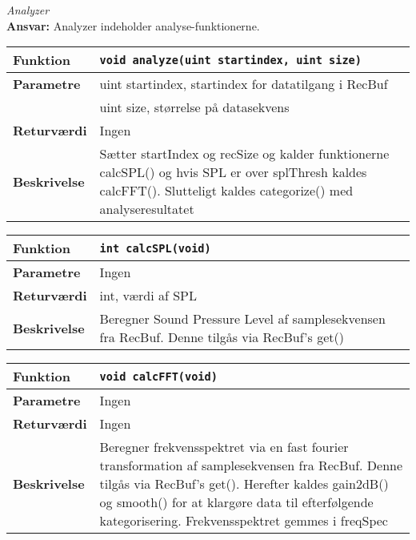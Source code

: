 \textit{Analyzer} \\
\textbf{Ansvar:} Analyzer indeholder analyse-funktionerne.

\begin{center}
    \begin{tabular}{ | l | p{} |}
    \hline
    \textbf{Funktion}	& \verb+void analyze(uint startindex, uint size) +			\\ \hline
    \textbf{Parametre} 	& uint startindex, startindex for datatilgang i RecBuf		\\ 
    					& uint size, størrelse på datasekvens						\\ \hline
    \textbf{Returværdi}	& Ingen 													\\ \hline
    \textbf{Beskrivelse}& Sætter startIndex og recSize og kalder funktionerne calcSPL() og hvis SPL er over splThresh kaldes calcFFT(). Slutteligt kaldes categorize() med analyseresultatet	\\ \hline
    \end{tabular}
\end{center} 

\begin{center}
    \begin{tabular}{ | l | p{} |}
    \hline
    \textbf{Funktion}	& \verb+int calcSPL(void) +						\\ \hline
    \textbf{Parametre} 	& Ingen		\\ \hline
    \textbf{Returværdi}	& int, værdi af SPL 								\\ \hline
    \textbf{Beskrivelse}& Beregner Sound Pressure Level af samplesekvensen fra RecBuf. Denne tilgås via RecBuf's get()		\\ \hline
    \end{tabular}
\end{center} 

\begin{center}
    \begin{tabular}{ | l | p{} |}
    \hline
    \textbf{Funktion}	& \verb+void calcFFT(void) +						\\ \hline
    \textbf{Parametre} 	& Ingen		\\ \hline
    \textbf{Returværdi}	& Ingen							\\ \hline
    \textbf{Beskrivelse}& Beregner frekvensspektret via en fast fourier transformation af samplesekvensen fra RecBuf. Denne tilgås via RecBuf's get(). Herefter kaldes gain2dB() og smooth() for at klargøre data til efterfølgende kategorisering. Frekvensspektret gemmes i freqSpec\\ \hline
    \end{tabular}
\end{center}

